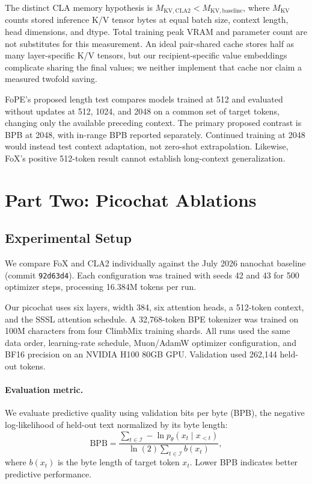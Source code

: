 \documentclass[11pt]{article}
\begin{document}
The distinct CLA memory hypothesis is
$M_{\mathrm{KV,CLA2}}<M_{\mathrm{KV,baseline}}$, where $M_{\mathrm{KV}}$
counts stored inference K/V tensor bytes at equal batch size, context length,
head dimensions, and dtype. Total training peak VRAM and parameter count
are not substitutes for this measurement. An ideal pair-shared cache stores
half as many layer-specific K/V tensors, but our recipient-specific value
embeddings complicate sharing the final values; we neither implement that
cache nor claim a measured twofold saving.

FoPE's proposed length test compares models trained at 512 and evaluated
without updates at 512, 1024, and 2048 on a common set of target tokens,
changing only the available preceding context. The primary proposed
contrast is BPB at 2048, with in-range BPB reported separately. Continued
training at 2048 would instead test context adaptation, not zero-shot
extrapolation. Likewise, FoX's positive 512-token result cannot establish
long-context generalization.
\pagebreak

\section{Part Two: Picochat Ablations}
\subsection{Experimental Setup}
We compare FoX and CLA2 individually against the July 2026
nanochat baseline (commit \texttt{92d63d4}). Each configuration
was trained with seeds 42 and 43 for 500 optimizer steps,
processing 16.384M tokens per run.

Our picochat uses six layers, width 384, six attention heads,
a 512-token context, and the SSSL attention schedule. A
32,768-token BPE tokenizer was trained on 100M characters
from four ClimbMix training shards. All runs used the same
data order, learning-rate schedule, Muon/AdamW optimizer
configuration, and BF16 precision on an NVIDIA H100 80GB GPU.
Validation used 262,144 held-out tokens.

\paragraph{Evaluation metric.}
We evaluate predictive quality using validation bits per byte
(BPB), the negative log-likelihood of held-out text normalized
by its byte length:
\begin{equation}
\mathrm{BPB} =
\frac{\sum_{t\in\mathcal I}-\ln p_\theta(x_t\mid x_{<t})}
{\ln(2)\sum_{t\in\mathcal I}b(x_t)},
\end{equation}
where $b(x_t)$ is the byte length of target token $x_t$.
Lower BPB indicates better predictive performance.
\end{document}
